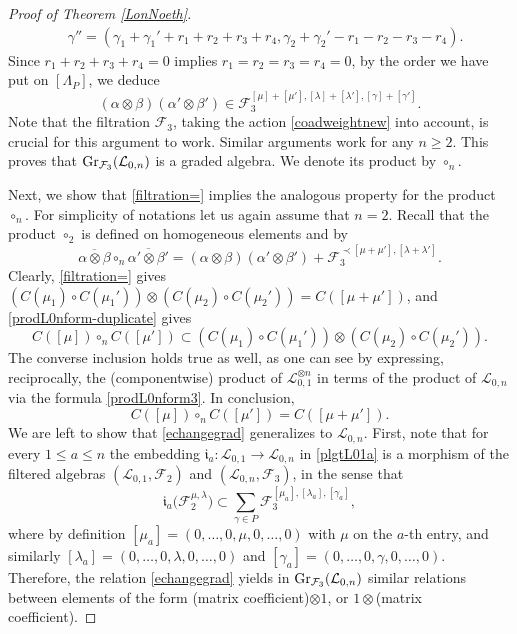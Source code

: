 \documentclass[pdftex]{sigma}
\numberwithin{equation}{section}
\theoremstyle{definition}
\newcommand{\Ff}{{\mathcal F}}
\newcommand{\Ll}{{\mathcal L}}
\newcommand{\ra}{\rightarrow}
\begin{document}
\begin{proof}[Proof of Theorem \ref{LonNoeth}]
\begin{align*}
& \gamma'' = (\gamma_1+\gamma_1'+r_1+r_2+r_3+r_4,\gamma_2+\gamma_2'-r_1-r_2-r_3-r_4).
\end{align*}
Since $r_1+r_2+r_3+r_4=0$ implies $r_1=r_2=r_3=r_4=0$, by the order we have put on $[\Lambda_P]$, we deduce
 \[(\alpha\otimes \beta)(\alpha'\otimes \beta') \in \Ff_3^{[\mu]+[\mu'],[\lambda]+[\lambda'],[\gamma]+[\gamma']}.\]
Note that the filtration $\mathcal{F}_3$, taking the action \eqref{coadweightnew} into account, is crucial for this argument to work. Similar arguments work for any $n\geq 2$. This proves that ${\rm Gr}_{{\mathcal F}_3}({\mathcal L}_{0,n})$ is a graded algebra. We denote its product by $\circ_n$.

Next, we show that \eqref{filtration=} implies the analogous property for the product $\circ_n$. For simplicity of notations let us again assume that $n=2$. Recall that the product $\circ_2$ is defined on homogeneous elements  and  by \[\overline{\alpha\otimes \beta}\circ_n\overline{\alpha'\otimes \beta'} = (\alpha\otimes \beta)(\alpha'\otimes \beta') + {\mathcal F}_3^{\prec [\mu+\mu'],[\lambda+\lambda']}.\]
Clearly, \eqref{filtration=} gives $(C(\mu_1)\circ C(\mu_1'))\otimes (C(\mu_2)\circ C(\mu_2')) = C([\mu + \mu'])$, and \eqref{prodL0nform-duplicate} gives
 \[C([\mu]) \circ_n C([\mu']) \subset (C(\mu_1)\circ C(\mu_1'))\otimes (C(\mu_2)\circ C(\mu_2')).\]
The converse inclusion holds true as well, as one can see by expressing, reciprocally, the (componentwise) product of $\Ll_{0,1}^{\otimes n}$ in terms of the product of $\Ll_{0,n}$ via the formula \eqref{prodL0nform3}. In conclusion,%
\[%
C([\mu]) \circ_n C([\mu']) = C([\mu + \mu']).
\]
We are left to show that \eqref{echangegrad} generalizes to $\Ll_{0,n}$. First, note that for every $1\leq a\leq n$ the embedding $\mathfrak{i}_a\colon \Ll_{0,1}\ra \Ll_{0,n}$ in \eqref{plgtL01a} is a morphism of the filtered algebras $(\Ll_{0,1},\mathcal{F}_2)$ and $(\Ll_{0,n},\mathcal{F}_3)$, in the sense that
\[\mathfrak{i}_a\big({\mathcal F}_2^{\mu,\lambda}\big) \subset \sum_{\gamma \in P} {\mathcal F}_3^{[\mu_a],[\lambda_a],[\gamma_a]},
\]
where by definition $[\mu_a] = (0,\dots,0,\mu,0,\dots,0)$ with $\mu$ on the $a$-th entry, and similarly $[\lambda_a] = (0,\dots,0,\lambda,0,\dots,0)$ and $[\gamma_a] = (0,\dots,0,\gamma,0,\dots,0)$. Therefore, the relation \eqref{echangegrad} yields in ${\rm Gr}_{{\mathcal F}_3}({\mathcal L}_{0,n})$ similar relations between elements of the form (matrix coefficient)$\otimes 1$, or $1 \otimes$(matrix coefficient).


\end{proof}
\end{document}
